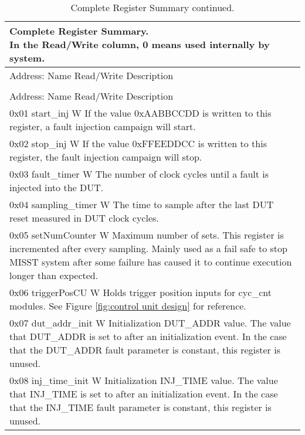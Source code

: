 \documentclass[]{report}
\begin{document}
\begin{center}
	\begin{longtable}{| p{\linewidth} |}
		\caption{Complete Register Summary. \\ In the Read/Write column, 0 means used internally by system.}
		\label{tab:register summary}\\
		\hline 
		Address: Name Read/Write \newline Description\\ 
		\endfirsthead
		\caption{Complete Register Summary continued.}\\
		\hline
		Address: Name Read/Write \newline Description\\ 
		\endhead
		\hline 
		0x01  start\_inj  W  \newline 
		If the value 0xAABBCCDD is written to this register, a fault injection campaign will start. \\
		\hline 
		0x02  stop\_inj  W \newline 
		If the value 0xFFEEDDCC is written to this register, the fault injection campaign will stop.\\ 
		\hline 
		0x03  fault\_timer W \newline
		The number of clock cycles until a fault is injected into the DUT.\\ 
		\hline 
		0x04  sampling\_timer  W \newline 
		The time to sample after the last DUT reset measured in DUT clock cycles. \\ 
		\hline
		0x05  setNumCounter  W \newline 
		Maximum number of sets. This register is incremented after every sampling. Mainly used as a fail safe to stop MISST system after some failure has caused it to continue execution longer than expected.\\
		\hline
		0x06  triggerPosCU  W \newline 
		Holds trigger position inputs for cyc\_cnt modules. See Figure \ref{fig:control unit design} for reference.\\
		\hline
		0x07  dut\_addr\_init  W \newline 
		Initialization DUT\_ADDR value. The value that DUT\_ADDR is set to after an initialization event. In the case that the DUT\_ADDR fault parameter is constant, this register is unused.\\
		\hline
		0x08  inj\_time\_init  W \newline 
		Initialization INJ\_TIME value. The value that INJ\_TIME is set to after an initialization event. In the case that the INJ\_TIME fault parameter is constant, this register is unused.\\

\end{longtable}
\end{center}
\end{document}
